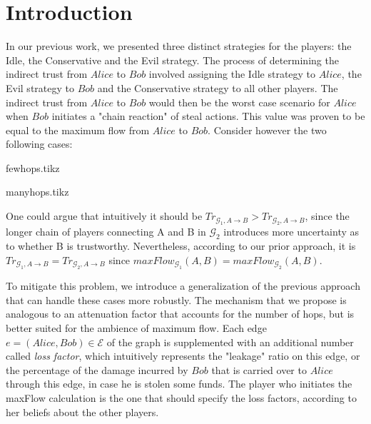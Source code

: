 \section{Introduction}
  In our previous work, we presented three distinct strategies for the players: the Idle, the Conservative and the Evil
  strategy. The process of determining the indirect trust from $Alice$ to $Bob$ involved assigning the Idle strategy to
  $Alice$, the Evil strategy to $Bob$ and the Conservative strategy to all other players. The indirect trust from $Alice$ to
  $Bob$ would then be the worst case scenario for $Alice$ when $Bob$ initiates a "chain reaction" of steal actions. This value
  was proven to be equal to the maximum flow from $Alice$ to $Bob$. Consider however the two following cases:

  {fewhops.tikz}

  {manyhops.tikz}

  One could argue that intuitively it should be $Tr_{\mathcal{G}_1, A \rightarrow B} > Tr_{\mathcal{G}_2, A \rightarrow B}$,
  since the longer chain of players connecting A and B in $\mathcal{G}_2$ introduces more uncertainty as to whether B is
  trustworthy. Nevertheless, according to our prior approach, it is $Tr_{\mathcal{G}_1, A \rightarrow B} = Tr_{\mathcal{G}_2,
  A \rightarrow B}$ since $maxFlow_{\mathcal{G}_1}\left(A, B\right) = maxFlow_{\mathcal{G}_2}\left(A, B\right)$.

  To mitigate this problem, we introduce a generalization of the previous approach that can handle these cases more
  robustly. The mechanism that we propose is analogous to an attenuation factor that accounts for the number of hops, but is
  better suited for the ambience of maximum flow. Each edge $e = \left(Alice, Bob\right) \in \mathcal{E}$ of the graph is
  supplemented with an additional number called \textit{loss factor}, which intuitively represents the "leakage" ratio on this
  edge, or the percentage of the damage incurred by $Bob$ that is carried over to $Alice$ through this edge, in case he is
  stolen some funds. The player who initiates the maxFlow calculation is the one that should specify the loss factors,
  according to her beliefs about the other players.
